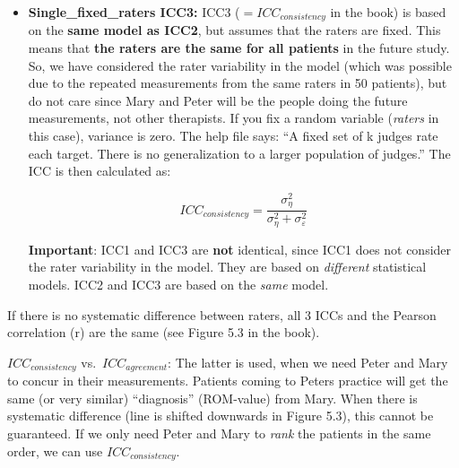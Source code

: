 \documentclass[
]{article}
\begin{document}
\begin{itemize}
  \[ICC_{agreement} = \frac{\sigma_{\eta}^2}{\sigma_{\eta}^2 +\mathbf{\sigma_{rater}^2} + \sigma_{\varepsilon}^2}\]
\item
  \textbf{Single\_fixed\_raters ICC3:}
  ICC3 (\(=ICC_{consistency}\) in the book) is based on the \textbf{same model as ICC2},
  but assumes that the raters are fixed.
  This means that \textbf{the raters are the same for all patients} in the future study.
  So, we have considered the rater variability in the model
  (which was possible due to the repeated measurements from the same raters in 50 patients),
  but do not care since Mary and Peter will be the people doing the future
  measurements, not other therapists. If you fix a random variable
  (\emph{raters} in this case), variance is zero. The help file says:
  ``A fixed set of k judges rate each target.
  There is no generalization to a larger population of judges.''
  The ICC is then calculated as:

  \[ICC_{consistency} = \frac{\sigma_{\eta}^2}{\sigma_{\eta}^2 + \sigma_{\varepsilon}^2}\]

  \textbf{Important}: ICC1 and ICC3 are \textbf{not} identical, since ICC1 does not consider the rater variability
  in the model. They are based on \emph{different} statistical models.
  ICC2 and ICC3 are based on the \emph{same} model.
\end{itemize}

If there is no systematic difference between raters, all 3 ICCs and the Pearson
correlation (r) are the same (see Figure 5.3 in the book).

\(ICC_{consistency}\) vs.~\(ICC_{agreement}\):
The latter is used, when we need Peter and Mary to concur in their measurements.
Patients coming to Peters practice will get the same (or very similar) ``diagnosis'' (ROM-value)
from Mary. When there is systematic difference (line is shifted downwards in Figure 5.3),
this cannot be guaranteed.
If we only need Peter and Mary to \emph{rank} the patients in the same order,
we can use \(ICC_{consistency}\).
\end{document}
